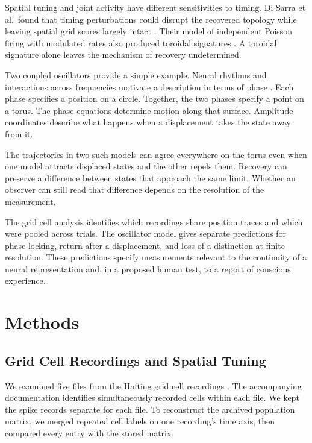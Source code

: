 \documentclass[12pt,a4paper]{article}
\begin{document}
Spatial tuning and joint activity have different sensitivities to timing. Di Sarra et al.\ found that timing perturbations could disrupt the recovered topology while leaving spatial grid scores largely intact \cite{DiSarra2025}. Their model of independent Poisson firing with modulated rates also produced toroidal signatures \cite{DiSarra2025,DiSarra2025Correction}. A toroidal signature alone leaves the mechanism of recovery undetermined.

Two coupled oscillators provide a simple example. Neural rhythms and interactions across frequencies motivate a description in terms of phase \cite{Buzsaki2006,Canolty2006,Tort2009}. Each phase specifies a position on a circle. Together, the two phases specify a point on a torus. The phase equations determine motion along that surface. Amplitude coordinates describe what happens when a displacement takes the state away from it.

The trajectories in two such models can agree everywhere on the torus even when one model attracts displaced states and the other repels them. Recovery can preserve a difference between states that approach the same limit. Whether an observer can still read that difference depends on the resolution of the measurement.

The grid cell analysis identifies which recordings share position traces and which were pooled across trials. The oscillator model gives separate predictions for phase locking, return after a displacement, and loss of a distinction at finite resolution. These predictions specify measurements relevant to the continuity of a neural representation and, in a proposed human test, to a report of conscious experience.

\section{Methods}\label{sec:methods}

\subsection{Grid Cell Recordings and Spatial Tuning}

We examined five files from the Hafting grid cell recordings \cite{Hafting2005,HaftingData2017}. The accompanying documentation identifies simultaneously recorded cells within each file. We kept the spike records separate for each file. To reconstruct the archived population matrix, we merged repeated cell labels on one recording's time axis, then compared every entry with the stored matrix.
\end{document}
